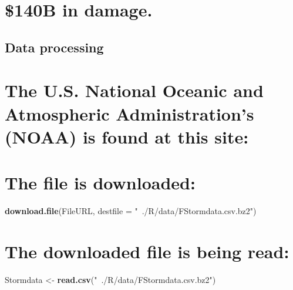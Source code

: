 \documentclass[]{article}
\newenvironment{Shaded}{\begin{snugshade}}{\end{snugshade}}
\newcommand{\DataTypeTok}[1]{\textcolor[rgb]{0.13,0.29,0.53}{#1}}
\newcommand{\KeywordTok}[1]{\textcolor[rgb]{0.13,0.29,0.53}{\textbf{#1}}}
\newcommand{\NormalTok}[1]{#1}
\newcommand{\StringTok}[1]{\textcolor[rgb]{0.31,0.60,0.02}{#1}}
\begin{document}
\hypertarget{b-in-damage.}{%
\section{\$140B in damage.}\label{b-in-damage.}}

\hypertarget{data-processing}{%
\subsection{Data processing}\label{data-processing}}

\hypertarget{the-u.s.-national-oceanic-and-atmospheric-administrations-noaa-is-found-at-this-site}{%
\section{The U.S. National Oceanic and Atmospheric Administration's
(NOAA) is found at this
site:}\label{the-u.s.-national-oceanic-and-atmospheric-administrations-noaa-is-found-at-this-site}}

\begin{Shaded}
\end{Shaded}

\hypertarget{the-file-is-downloaded}{%
\section{The file is downloaded:}\label{the-file-is-downloaded}}

\begin{Shaded}
\begin{Highlighting}[]
\KeywordTok{download.file}\NormalTok{(FileURL, }\DataTypeTok{destfile =} \StringTok{"~./R/data/FStormdata.csv.bz2"}\NormalTok{)}
\end{Highlighting}
\end{Shaded}

\hypertarget{the-downloaded-file-is-being-read}{%
\section{The downloaded file is being
read:}\label{the-downloaded-file-is-being-read}}

\begin{Shaded}
\begin{Highlighting}[]
\NormalTok{Stormdata <-}\StringTok{ }\KeywordTok{read.csv}\NormalTok{(}\StringTok{"~./R/data/FStormdata.csv.bz2"}\NormalTok{)}
\end{Highlighting}
\end{Shaded}
\end{document}
